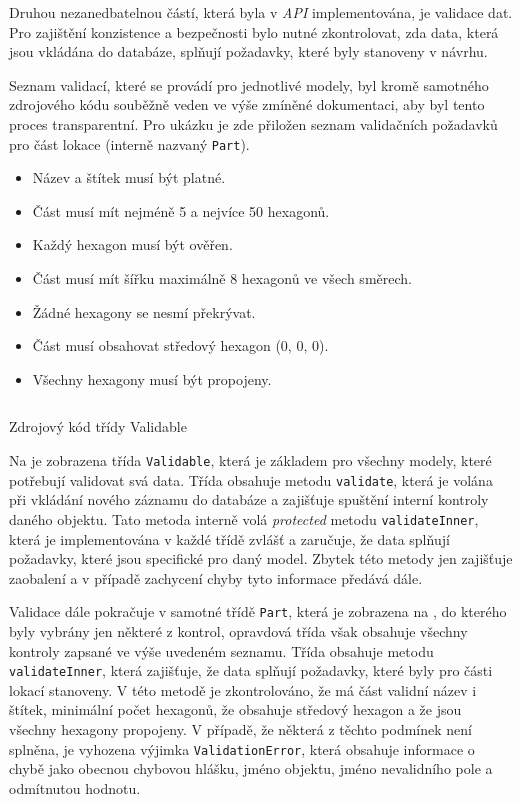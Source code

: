 Druhou nezanedbatelnou částí, která byla v \textit{API} implementována, je validace dat. Pro zajištění konzistence a bezpečnosti bylo nutné zkontrolovat, zda data, která jsou vkládána do databáze, splňují požadavky, které byly stanoveny v návrhu.

Seznam validací, které se provádí pro jednotlivé modely, byl kromě samotného zdrojového kódu souběžně veden ve výše zmíněné dokumentaci, aby byl tento proces transparentní. Pro ukázku je zde přiložen seznam validačních požadavků pro část lokace (interně nazvaný \texttt{Part}).

\begin{itemize}
    \setlength\itemsep{0.5mm}
    \item Název a štítek musí být platné.
    \item Část musí mít nejméně 5 a nejvíce 50 hexagonů.
    \item Každý hexagon musí být ověřen.
    \item Část musí mít šířku maximálně 8 hexagonů ve všech směrech.
    \item Žádné hexagony se nesmí překrývat.
    \item Část musí obsahovat středový hexagon (0, 0, 0).
    \item Všechny hexagony musí být propojeny.
\end{itemize}

\begin{listing}[h]
    \inputminted{Java}{code/Validable.java}
    \caption{Zdrojový kód třídy Validable}
    \label{code:validable}
\end{listing}

Na  je zobrazena třída \texttt{Validable}, která je základem pro všechny modely, které potřebují validovat svá data. Třída obsahuje metodu \texttt{validate}, která je volána při vkládání nového záznamu do databáze a zajišťuje spuštění interní kontroly daného objektu. Tato metoda interně volá \textit{protected} metodu \texttt{validateInner}, která je implementována v každé třídě zvlášť a zaručuje, že data splňují požadavky, které jsou specifické pro daný model. Zbytek této metody jen zajišťuje zaobalení a v případě zachycení chyby tyto informace předává dále.

Validace dále pokračuje v samotné třídě \texttt{Part}, která je zobrazena na , do kterého byly vybrány jen některé z kontrol, opravdová třída však obsahuje všechny kontroly zapsané ve výše uvedeném seznamu. Třída obsahuje metodu \texttt{validateInner}, která zajišťuje, že data splňují požadavky, které byly pro části lokací stanoveny. V této metodě je zkontrolováno, že má část validní název i štítek, minimální počet hexagonů, že obsahuje středový hexagon a že jsou všechny hexagony propojeny. V případě, že některá z těchto podmínek není splněna, je vyhozena výjimka \texttt{ValidationError}, která obsahuje informace o chybě jako obecnou chybovou hlášku, jméno objektu, jméno nevalidního pole a odmítnutou hodnotu.

